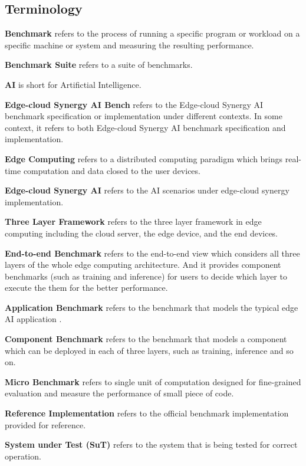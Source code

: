 \subsection{Terminology}

\hspace{0.3cm}
\textbf{Benchmark} refers to the process of running a specific program or workload on a specific machine or system and measuring the resulting performance.

\textbf{Benchmark Suite} refers to a suite of benchmarks.

\textbf{AI} is short for Artifictial Intelligence.

\textbf{Edge-cloud Synergy AI Bench} refers to the Edge-cloud Synergy AI benchmark specification or implementation under different contexts. In some context, it refers to both Edge-cloud Synergy AI benchmark specification and implementation.

\textbf{Edge Computing} refers to a distributed computing paradigm which brings real-time computation and data closed to the user devices.

\textbf{Edge-cloud Synergy AI} refers to the AI scenarios under edge-cloud synergy implementation.

\textbf{Three Layer Framework} refers to the three layer framework in edge computing including the cloud server, the edge device, and the end devices.

\textbf{End-to-end Benchmark} refers to the end-to-end view which considers all three layers of the whole edge computing architecture. And it provides component benchmarks (such as training and inference) for users to decide which layer to execute the them for the better performance.

\textbf{Application Benchmark} refers to the benchmark that models the typical edge AI application .

\textbf{Component Benchmark} refers to the benchmark that models a component which can be deployed in each of three layers, such as training, inference and so on.

\textbf{Micro Benchmark} refers to single unit of computation designed for fine-grained evaluation and measure the performance of small piece of code.

\textbf{Reference Implementation} refers to the official benchmark implementation provided for reference.

\textbf{System under Test (SuT)} refers to the system that is being tested for correct operation.

